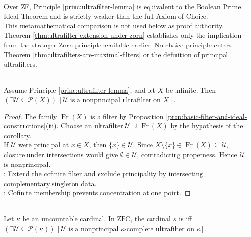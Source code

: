\begin{remark} \label{rem:choice-strength-of-ultrafilter-extension} \\
Over ZF, Principle \ref{princ:ultrafilter-lemma} is equivalent to the Boolean Prime Ideal Theorem and is strictly weaker than the full Axiom of Choice.\\
This metamathematical comparison is not used below as proof authority. Theorem \ref{thm:ultrafilter-extension-under-zorn} establishes only the implication from the stronger Zorn principle available earlier. No choice principle enters Theorem \ref{thm:ultrafilters-are-maximal-filters} or the definition of principal ultrafilters.
\end{remark}

\begin{corollary} \label{cor:nonprincipal-ultrafilter-on-infinite-set} \\
Assume Principle \ref{princ:ultrafilter-lemma}, and let $X$ be infinite. Then $(\exists\mathcal{U}\subseteq\mathcal{P}(X))\,[\mathcal{U}\text{ is a nonprincipal ultrafilter on }X]$.
\begin{proof}
The family $\operatorname{Fr}(X)$ is a filter by Proposition \ref{prop:basic-filter-and-ideal-constructions}(iii). Choose an ultrafilter $\mathcal{U}\supseteq\operatorname{Fr}(X)$ by the hypothesis of the corollary.\\
If $\mathcal{U}$ were principal at $x\in X$, then $\{x\}\in\mathcal{U}$. Since $X\setminus\{x\}\in\operatorname{Fr}(X)\subseteq\mathcal{U}$, closure under intersections would give $\emptyset\in\mathcal{U}$, contradicting properness. Hence $\mathcal{U}$ is nonprincipal.\\
: Extend the cofinite filter and exclude principality by intersecting complementary singleton data.\\
: Cofinite membership prevents concentration at one point.
\end{proof}
\end{corollary}

\begin{definition} \label{def:measurable-cardinal-via-ultrafilter} \\
Let $\kappa$ be an uncountable cardinal. In $\mathrm{ZFC}$, the cardinal $\kappa$ is  iff $(\exists\mathcal{U}\subseteq\mathcal{P}(\kappa))\,[\mathcal{U}\text{ is a nonprincipal $\kappa$-complete ultrafilter on }\kappa]$.
\end{definition}

